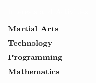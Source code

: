 \documentclass[twoside,a4paper,openright,10pt]{report}
\begin{document}
\begin{table}[ht]
\begin{tabular}{p{40mm} p{140mm}}
\\
\multicolumn{2}{c}{\cellcolor{black} \textcolor{white}{Interests and Activities}}\\ \\

\textbf{Martial Arts}\\
\textbf{Technology}\\
\textbf{Programming}\\
\textbf{Mathematics}

\end{tabular}
\end{table}
\end{document}
